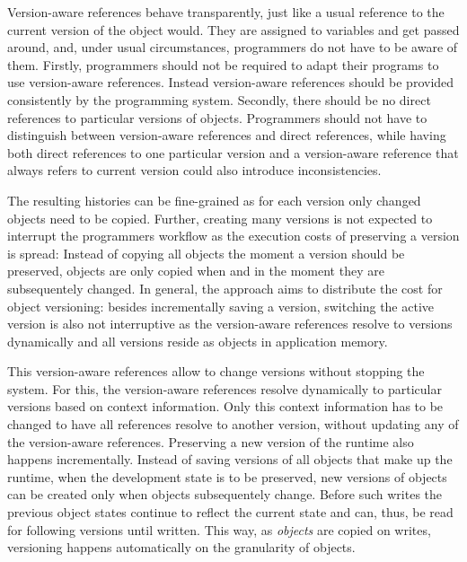 
Version-aware references behave transparently, just like a usual reference to the current version of the object would.
They are assigned to variables and get passed around, and, under usual circumstances, programmers do not have to be aware of them.
Firstly, programmers should not be required to adapt their programs to use version-aware references.
Instead version-aware references should be provided consistently by the programming system.
Secondly, there should be no direct references to particular versions of objects.
Programmers should not have to distinguish between version-aware references and direct references, while having both direct references to one particular version and a version-aware reference that always refers to current version could also introduce inconsistencies.



The resulting histories can be fine-grained as for each version only changed objects need to be copied.
Further, creating many versions is not expected to interrupt the programmers workflow as the execution costs of preserving a version is spread: Instead of copying all objects the moment a version should be preserved, objects are only copied when and in the moment they are subsequentely changed.
In general, the approach aims to distribute the cost for object versioning: besides incrementally saving a version, switching the active version is also not interruptive as the version-aware references resolve to versions dynamically and all versions reside as objects in application memory.


This version-aware references allow to change versions without stopping the system.
For this, the version-aware references resolve dynamically to particular versions based on context information.
Only this context information has to be changed to have all references resolve to another version, without updating any of the version-aware references.
Preserving a new version of the runtime also happens incrementally.
Instead of saving versions of all objects that make up the runtime, when the development state is to be preserved, new versions of objects can be created only when objects subsequentely change.
Before such writes the previous object states continue to reflect the current state and can, thus, be read for following versions until written.
This way, as \emph{objects} are copied on writes, versioning happens automatically on the granularity of objects.






